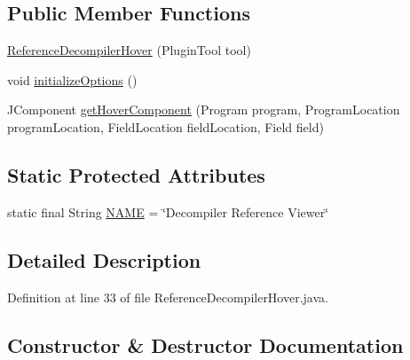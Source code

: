 \subsection*{Public Member Functions}
\begin{DoxyCompactItemize}
\item 
\mbox{\hyperlink{classghidra_1_1app_1_1decompiler_1_1component_1_1hover_1_1_reference_decompiler_hover_ad3a0b0b68836be670eb44eb4bccb4954}{Reference\+Decompiler\+Hover}} (Plugin\+Tool tool)
\item 
void \mbox{\hyperlink{classghidra_1_1app_1_1decompiler_1_1component_1_1hover_1_1_reference_decompiler_hover_a6f804c620c79cc6f5b536590b8915e5b}{initialize\+Options}} ()
\item 
J\+Component \mbox{\hyperlink{classghidra_1_1app_1_1decompiler_1_1component_1_1hover_1_1_reference_decompiler_hover_a8ee51e3b987f10ea9c5d9dda29b11611}{get\+Hover\+Component}} (Program program, Program\+Location program\+Location, Field\+Location field\+Location, Field field)
\end{DoxyCompactItemize}
\subsection*{Static Protected Attributes}
\begin{DoxyCompactItemize}
\item 
static final String \mbox{\hyperlink{classghidra_1_1app_1_1decompiler_1_1component_1_1hover_1_1_reference_decompiler_hover_ae4c879ed414e0bec22ecd296a4db5a17}{N\+A\+ME}} = \char`\"{}Decompiler Reference Viewer\char`\"{}
\end{DoxyCompactItemize}


\subsection{Detailed Description}


Definition at line 33 of file Reference\+Decompiler\+Hover.\+java.



\subsection{Constructor \& Destructor Documentation}
\mbox{\label{classghidra_1_1app_1_1decompiler_1_1component_1_1hover_1_1_reference_decompiler_hover_ad3a0b0b68836be670eb44eb4bccb4954}} 
